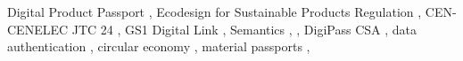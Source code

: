 \begin{keyword}
Digital Product Passport \sep 
Ecodesign for Sustainable Products Regulation \sep 
CEN-CENELEC JTC 24 \sep 
GS1 Digital Link \sep 
Semantics \sep 
\SHACL \sep 
DigiPass CSA \sep 
data authentication \sep 
circular economy \sep  
material passports \sep 
\end{keyword}
